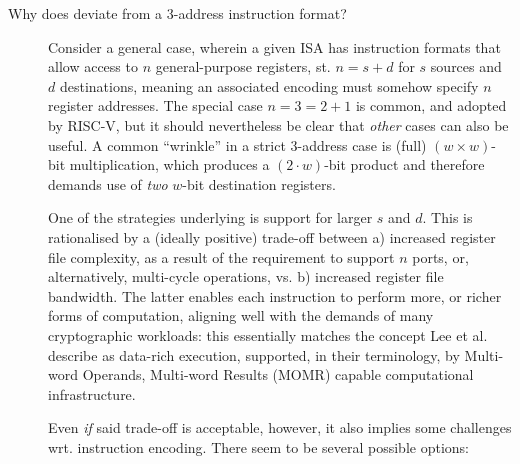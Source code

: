 \begin{description}
\begin{itemize}
      \end{itemize}

\item[Why does \XCID deviate from a $3$-address instruction format?]
      Consider a general case, wherein a given ISA has instruction formats
      that allow access to $n$ general-purpose registers, st. 
      $
      n = s + d
      $ 
      for $s$ sources and $d$ destinations, meaning an associated encoding 
      must somehow specify $n$ register addresses.  The special case
      $
      n = 3 = 2 + 1 
      $
      is common, and adopted by RISC-V, but it should nevertheless be clear
      that {\em other} cases can also be useful.  A common ``wrinkle'' in a 
      strict $3$-address case is (full) $( w \times w )$-bit multiplication, 
      which produces a $(2 \cdot w )$-bit product and therefore demands use 
      of {\em two} $w$-bit destination registers.
   
      One of the strategies underlying \XCID is support for larger $s$ and
      $d$.  This is rationalised by a (ideally positive) trade-off between
      a) increased register file complexity, as a result of the requirement
         to support $n$ ports, or, alternatively, multi-cycle operations,
         vs.
      b) increased register file bandwidth.
      The latter enables each instruction to perform more, or richer forms 
      of computation, aligning well with the demands of many cryptographic 
      workloads: this essentially matches the concept
      Lee et al.~\cite{SCARV:LeeYanShi:04}
      describe as data-rich execution, supported, in their terminology, by 
      Multi-word Operands, Multi-word Results (MOMR)
      capable computational infrastructure.

      Even {\em if} said trade-off is acceptable, however, it also implies 
      some challenges wrt. instruction encoding.  There seem to be several 
      possible options:


\end{description}
